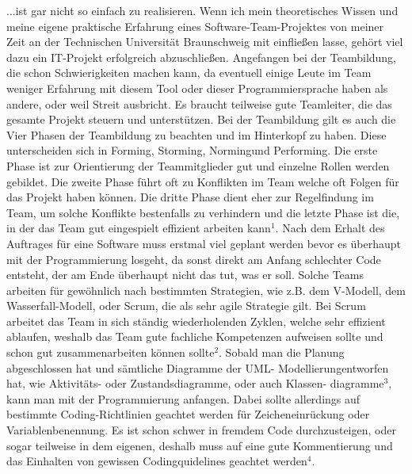 \documentclass[12pt]{scrartcl}
\begin{document}
...ist gar nicht so einfach zu realisieren. Wenn ich mein theoretisches Wissen und meine eigene praktische Erfahrung eines Software-Team-Projektes von meiner Zeit an der Technischen Universität Braunschweig mit einfließen lasse, gehört viel dazu ein IT-Projekt erfolgreich abzuschließen.
\newline
\newline
Angefangen bei der Teambildung, die schon Schwierigkeiten machen kann, da eventuell einige Leute im Team weniger Erfahrung mit diesem Tool oder dieser Programmiersprache haben als andere, oder weil Streit ausbricht. Es braucht teilweise gute Teamleiter, die das gesamte Projekt steuern und unterstützen. Bei der Teambildung gilt es auch die Vier Phasen der Teambildung zu beachten und im Hinterkopf zu haben. Diese unterscheiden sich in \glqq Forming\grqq , \glqq Storming\grqq, \glqq Norming\grqq und \glqq Performing\grqq. Die erste Phase ist zur Orientierung der Teammitglieder gut und einzelne Rollen werden gebildet. Die zweite Phase führt oft zu Konflikten im Team welche oft Folgen für das Projekt haben können. Die dritte Phase dient eher zur Regelfindung im Team, um solche Konflikte bestenfalls zu verhindern und die letzte Phase ist die, in der das Team gut eingespielt effizient arbeiten kann$^1$.
\newline
\newline
Nach dem Erhalt des Auftrages für eine Software muss erstmal viel geplant werden bevor es überhaupt mit der Programmierung losgeht, da sonst direkt am Anfang schlechter Code entsteht, der am Ende überhaupt nicht das tut, was er soll. Solche Teams arbeiten für gewöhnlich nach bestimmten Strategien, wie z.B. dem V-Modell, dem Wasserfall-Modell, oder Scrum, die als sehr agile Strategie gilt. Bei Scrum arbeitet das Team in sich ständig wiederholenden Zyklen, welche sehr effizient ablaufen, weshalb das Team gute fachliche Kompetenzen aufweisen sollte und schon gut zusammenarbeiten können sollte$^2$.
\newline
\newline
Sobald man die Planung abgeschlossen hat und sämtliche Diagramme der \glqq UML-
Modellierung\grqq entworfen hat, wie Aktivitäts- oder Zustandsdiagramme, oder auch Klassen-
\newline
diagramme$^3$, kann man mit der Programmierung anfangen. Dabei sollte allerdings auf bestimmte Coding-Richtlinien geachtet werden für Zeicheneinrückung oder Variablenbenennung. Es ist schon schwer in fremdem Code durchzusteigen, oder sogar teilweise in dem eigenen, deshalb muss auf eine gute Kommentierung und das Einhalten von gewissen Codingquidelines geachtet werden$^4$.
\end{document}
